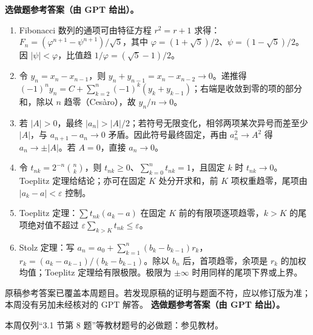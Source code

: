 \noindent\textbf{选做题参考答案（由 GPT 给出）。}
\begin{enumerate}
\item Fibonacci 数列的通项可由特征方程 $r^2=r+1$ 求得：$F_n=(\varphi^{n+1}-\psi^{n+1})/\sqrt5$，其中 $\varphi=(1+\sqrt5)/2$、$\psi=(1-\sqrt5)/2$。因 $|\psi|<\varphi$，比值趋 $1/\varphi=(\sqrt5-1)/2$。
\item 令 $y_n=x_n-x_{n-1}$，则 $y_n+y_{n-1}=x_n-x_{n-2}\to0$。递推得 $(-1)^ny_n=C+\sum_{k=2}^n(-1)^k(y_k+y_{k-1})$；右端是收敛到零的项的部分和，除以 $n$ 趋零（Ces\`aro），故 $y_n/n\to0$。
\item 若 $|A|>0$，最终 $|a_n|>|A|/2$；若符号无限变化，相邻两项某次异号而差至少 $|A|$，与 $a_{n+1}-a_n\to0$ 矛盾。因此符号最终固定，再由 $a_n^2\to A^2$ 得 $a_n\to\pm|A|$。若 $A=0$，直接 $a_n\to0$。
\item 令 $t_{nk}=2^{-n}\binom nk$，则 $t_{nk}\ge0$、$\sum_{k=0}^nt_{nk}=1$，且固定 $k$ 时 $t_{nk}\to0$。Toeplitz 定理给结论；亦可在固定 $K$ 处分开求和，前 $K$ 项权重趋零，尾项由 $|a_k-a|<\varepsilon$ 控制。
\item Toeplitz 定理：$\sum t_{nk}(a_k-a)$ 在固定 $K$ 前的有限项逐项趋零，$k>K$ 的尾项绝对值不超过 $\varepsilon\sum_{k>K}t_{nk}\le\varepsilon$。
\item Stolz 定理：写 $a_n=a_0+\sum_{k=1}^n(b_k-b_{k-1})r_k$，$r_k=(a_k-a_{k-1})/(b_k-b_{k-1})$。除以 $b_n$ 后，首项趋零，余项是 $r_k$ 的加权均值；Toeplitz 定理给有限极限。极限为 $\pm\infty$ 时用同样的尾项下界或上界。
\end{enumerate}
\noindent 原稿参考答案已覆盖本周题目。若发现原稿的证明与题面不符，应以修订版为准；本周没有另加未经核对的 GPT 解答。
\noindent\textbf{选做题参考答案（由 GPT 给出）。}
\par\noindent 本周仅列“3.1 节第 8 题”等教材题号的必做题：参见教材。
